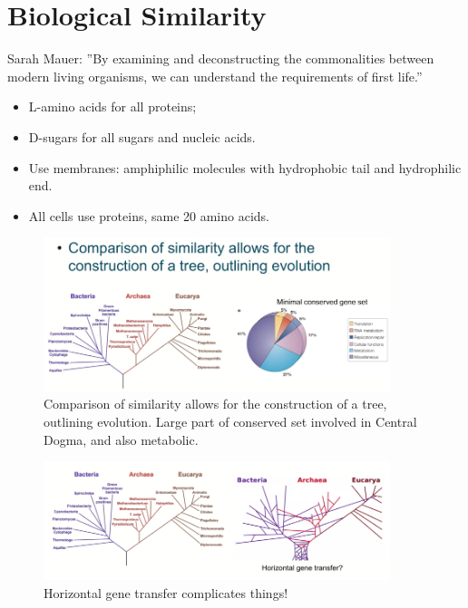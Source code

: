 \documentclass[]{article}
\begin{document}
\section{Biological Similarity}

Sarah Mauer: ''By examining and deconstructing the commonalities between modern living organisms, we can understand the requirements of first life.''

\begin{itemize}
	\item L-amino acids for all proteins;
	\item D-sugars for all sugars and nucleic acids.
	\item Use membranes: amphiphilic molecules with hydrophobic tail and hydrophilic end.
	\item All cells use proteins, same 20 amino acids.
\end{itemize}

\begin{figure}[H]
	\caption{Comparison of similarity allows for the
		construction of a tree, outlining evolution. Large part of conserved set involved in Central Dogma, and also metabolic.}\label{fig:Phylogeny} 
	\includegraphics[width=0.9\textwidth]{Phylogeny}
\end{figure}

\begin{figure}[H]
	\caption{Horizontal gene transfer complicates things!}\label{fig:PhylogenyHorizontal} 
	\includegraphics[width=0.9\textwidth]{PhylogenyHorizontal}
\end{figure}
\end{document}
